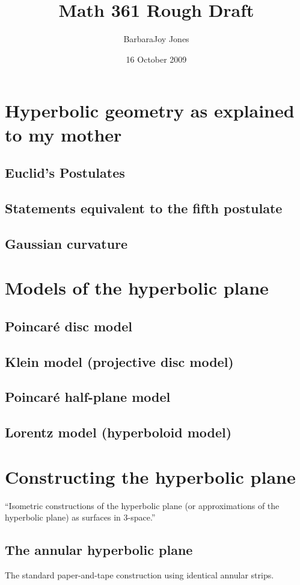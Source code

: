\documentclass{article}
\title{Math 361 Rough Draft}
\author{BarbaraJoy Jones}
\date{16 October 2009}
\begin{document}
\maketitle

\section{Hyperbolic geometry as explained to my mother}
\subsection{Euclid's Postulates}
\subsection{Statements equivalent to the fifth postulate}
\subsection{Gaussian curvature}

\section{Models of the hyperbolic plane}
\subsection{Poincar\'e disc model}
\subsection{Klein model (projective disc model)}
\subsection{Poincar\'e half-plane model}
\subsection{Lorentz model (hyperboloid model)}

\section{Constructing the hyperbolic plane}
``Isometric constructions of the hyperbolic plane (or approximations of the hyperbolic plane) as surfaces in 3-space.'' \cite{crochetplane}
\subsection{The annular hyperbolic plane}
The standard paper-and-tape construction using identical annular strips.
\end{document}

